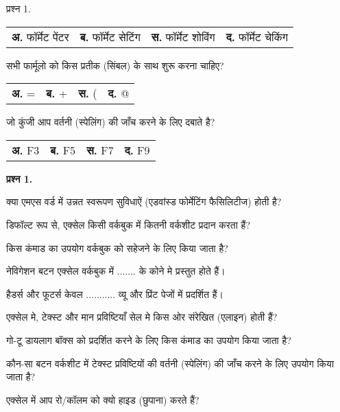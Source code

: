 \begin{descriptionSimple}{प्रश्न 1.}
		\begin{tabular}{llll}
		\textbf{अ.}  फॉर्मेट पेंटर & 
		\textbf{ब.} फॉर्मेट सेटिंग &
		\textbf{स.} फॉर्मेट शोविंग &
		\textbf{द.} फॉर्मेट चेकिंग 
		\end{tabular}
\item[\textbf{प्रश्न 6.}] सभी फार्मूलो को किस प्रतीक (सिंबल) के साथ शुरू करना चाहिए?

		\begin{tabular}{llll}
		\textbf{अ.}  =  & 
		\textbf{ब.}  +  &
		\textbf{स.} (  &
		\textbf{द.} @ 
		\end{tabular}
\item[\textbf{प्रश्न 7}] जो कुंजी आप वर्तनी (स्पेलिंग) की जाँच करने के लिए दबाते है?

		\begin{tabular}{llll}
		\textbf{अ.}  F3 &
		\textbf{ब.} F5 &
		\textbf{स.} F7 &
		\textbf{द.} F9
		\end{tabular}
\end{descriptionSimple}

\begin{descriptionSimple}{\textbf{प्रश्न 1.}}
\item[\textbf{प्रश्न 1}] क्या एमएस वर्ड में उन्नत स्वरूपण सुविधाऐं (एडवांस्ड फोर्मेटिंग फैसिलिटीज) होती है?
\item[\textbf{प्रश्न 2}] डिफॉल्ट रूप से, एक्सेल किसी वर्कबुक में कितनी वर्कशीट प्रदान करता हैं?
\item[\textbf{प्रश्न 3}] किस कंमाड का उपयोग वर्कबुक को सहेजने के लिए किया जाता है?
\item[\textbf{प्रश्न 4}] नेविगेशन बटन एक्सेल वर्कबुक में ....... के कोने मे प्रस्तुत होते हैं।
\item[\textbf{प्रश्न 5}] हैडर्स और फूटर्स केवल ........... व्यू और प्रिंट पेजों में प्रदर्शित हैं।
\item[\textbf{प्रश्न 6}] एक्सेल मे, टेक्स्ट और मान प्रविष्टियाँ सेल मे किस ओर संरेखित (एलाइन) होती हैं?
\item[\textbf{प्रश्न 7}] गो-टू डायलाग बॉक्स को प्रदर्शित करने के लिए किस कंमाड का उपयोग किया जाता है?
\item[\textbf{प्रश्न 8}] कौन-सा बटन वर्कशीट में टेक्स्ट प्रविष्टियों की वर्तनी (स्पेलिंग) की जाँच करने के लिए उपयोग किया जाता है?
\item[\textbf{प्रश्न 9}] एक्सेल में आप रो/कॉलम को क्यो हाइड (छुपाना) करते हैं?
\end{descriptionSimple}

